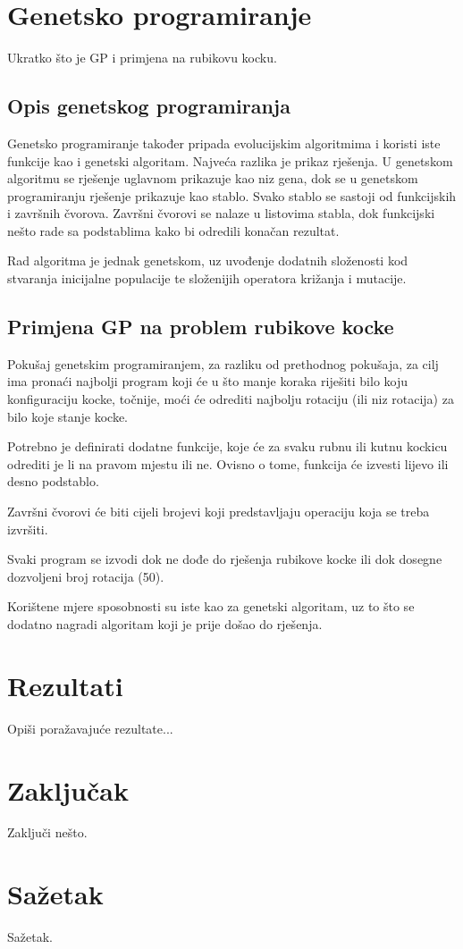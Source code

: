 \documentclass[times, utf8, seminar, numeric]{fer}
\begin{document}

\chapter{Genetsko programiranje}
Ukratko što je GP i primjena na rubikovu kocku.

\section{Opis genetskog programiranja}
Genetsko programiranje također pripada evolucijskim algoritmima i koristi iste funkcije kao i genetski algoritam. Najveća razlika je prikaz rješenja. U genetskom algoritmu se rješenje uglavnom prikazuje kao niz gena, dok se u genetskom programiranju rješenje prikazuje kao stablo. Svako stablo se sastoji od funkcijskih  i završnih  čvorova. Završni čvorovi se nalaze u listovima stabla, dok funkcijski nešto rade sa podstablima kako bi odredili konačan rezultat.

Rad algoritma je jednak genetskom, uz uvođenje dodatnih složenosti kod stvaranja inicijalne populacije te složenijih operatora križanja i mutacije.


\section{Primjena GP na problem rubikove kocke}
Pokušaj genetskim programiranjem, za razliku od prethodnog pokušaja, za cilj ima pronaći najbolji program koji će u što manje koraka riješiti bilo koju konfiguraciju kocke, točnije, moći će odrediti najbolju rotaciju (ili niz rotacija) za bilo koje stanje kocke. 

Potrebno je definirati dodatne funkcije, koje će za svaku rubnu ili kutnu kockicu odrediti je li na pravom mjestu ili ne. Ovisno o tome, funkcija će izvesti lijevo ili desno podstablo. 

Završni čvorovi će biti cijeli brojevi koji predstavljaju operaciju koja se treba izvršiti.

Svaki program se izvodi dok ne dođe do rješenja rubikove kocke ili dok dosegne dozvoljeni broj rotacija (50).

Korištene mjere sposobnosti su iste kao za genetski algoritam, uz to što se dodatno nagradi algoritam koji je prije došao do rješenja.



\chapter{Rezultati}
Opiši poražavajuće rezultate...

\chapter{Zaključak}
Zaključi nešto.




\chapter{Sažetak}
Sažetak.
\end{document}
